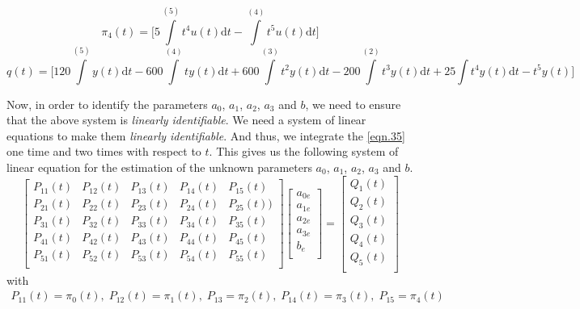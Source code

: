 \documentclass[letterpaper%
, twoside%
, 12pt%
,memoire%
, english%
,creativecommons,hyperref%
]{thETS}
\begin{document}
\begin{equation*}
\pi_{4}(t) = \bigg[5 \int\limits^{(5)} t^4 u(t) \mathrm{d}t - \int\limits^{(4)} t^5 u(t) \mathrm{d}t \bigg]
\end{equation*}
\begin{equation*}
q(t) = \bigg[120\int\limits^{(5)}y(t) \mathrm{d}t - 600\int\limits^{(4)}ty(t)\mathrm{d}t + 600\int\limits^{(3)}t^2y(t)\mathrm{d}t - 200\int\limits^{(2)}t^3y(t)\mathrm{d}t + 25\int t^4y(t)\mathrm{d}t- t^5y(t) \bigg]
\end{equation*}

\par Now, in order to identify the parameters $a_{0}$, $a_{1}$, $a_{2}$, $a_{3}$ and $b$, we need to ensure that the above system is \textit{linearly identifiable}. We need a system of linear equations to make them \textit{linearly identifiable}. And thus, we integrate the \eqref{eqn.35} one time and two times with respect to $t$. This gives us the following system of linear equation for the estimation of the unknown parameters $a_{0}$, $a_{1}$, $a_{2}$, $a_{3}$ and $b$.
\begin{equation}\label{eqn:98}
\begin{bmatrix}
P_{11}(t) & P_{12}(t) & P_{13}(t) & P_{14}(t) & P_{15}(t) \\
P_{21}(t) & P_{22}(t) & P_{23}(t) & P_{24}(t) & P_{25}(t)) \\
P_{31}(t) & P_{32}(t) & P_{33}(t) & P_{34}(t) & P_{35}(t) \\
P_{41}(t) & P_{42}(t) & P_{43}(t) & P_{44}(t) & P_{45}(t) \\
P_{51}(t) & P_{52}(t) & P_{53}(t) & P_{54}(t) & P_{55}(t) \\
\end{bmatrix}
\begin{bmatrix}
a_{0e} \\
a_{1e} \\
a_{2e} \\
a_{3e} \\
b_{e} \\
\end{bmatrix}
= 
\begin{bmatrix}
Q_{1}(t) \\
Q_{2}(t) \\
Q_{3}(t) \\
Q_{4}(t) \\
Q_{5}(t) \\
\end{bmatrix}
\end{equation}
with 
\begin{align*}
P_{11}(t) = \pi_{0}(t), \; P_{12}(t) = \pi_{1}(t), \; P_{13} = \pi_{2}(t), \; P_{14}(t) = \pi_{3}(t), \; P_{15} = \pi_{4}(t)
\end{align*}
\end{document}
